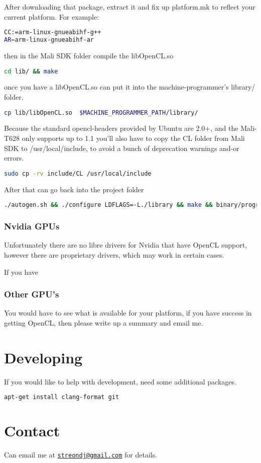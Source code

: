 \documentclass[12pt]{article}
\begin{document}
After downloading that package, extract it and fix up platform.mk to reflect
your current platform. For example:
\begin{lstlisting}[language=bash]
CC:=arm-linux-gnueabihf-g++
AR=arm-linux-gnueabihf-ar
\end{lstlisting}

then in the Mali SDK folder compile the libOpenCL.so
\begin{lstlisting}[language=bash]
cd lib/ && make
\end{lstlisting}
once you have a libOpenCL.so can put it into the machine-programmer's 
library/ folder.
\begin{lstlisting}[language=bash]
cp lib/libOpenCL.so  $MACHINE_PROGRAMMER_PATH/library/
\end{lstlisting}

Because the standard opencl-headers provided by Ubuntu are 2.0+, and the
Mali-T628 only supports up to 1.1 you'll also have to copy the CL folder 
from Mali SDK to /usr/local/include, to avoid a bunch of deprecation
warnings and-or errors.
\begin{lstlisting}[language=bash]
sudo cp -rv include/CL /usr/local/include
\end{lstlisting}

After that can go back into the project folder
\begin{lstlisting}[language=bash]
./autogen.sh && ./configure LDFLAGS=-L./library && make && binary/programmer
\end{lstlisting}

\subsubsection{Nvidia GPUs}
Unfortunately there are no libre drivers for Nvidia that have OpenCL support,
however there are proprietary drivers, which may work in certain cases. 

If you have 

\subsubsection{Other GPU's}
You would have to see what is available for your platform,
if you have success in getting OpenCL, then please write up a summary and email
me.

\section{Developing}

If you would like to help with development, need some additional packages.
\begin{lstlisting}[language=bash]
apt-get install clang-format git
\end{lstlisting}

\section{Contact}
Can email me at \href{mailto:streondj@gmail.com}{\nolinkurl{streondj@gmail.com}}
for details.
\end{document}
